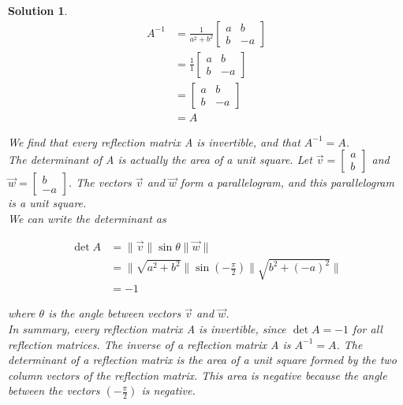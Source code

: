 \documentclass{article}
\newtheorem*{solution}{Solution}
\begin{document}
\begin{solution}
\begin{align*}
A^{-1} &= \displaystyle \frac{1}{a^2+b^2} \begin{bmatrix}a & b \\ b & -a \end{bmatrix} \\
&= \displaystyle \frac{1}{1} \begin{bmatrix}a & b \\ b & -a \end{bmatrix} \\
&= \begin{bmatrix}a & b \\ b & -a \end{bmatrix} \\
&= A
\end{align*}

We find that every reflection matrix A is invertible, and that $A^{-1} = A$. \\

The determinant of A is actually the area of a unit square. Let $\vec{v} = \begin{bmatrix} a \\ b \end{bmatrix}$ and $\vec{w} = \begin{bmatrix} b \\ -a \end{bmatrix}$. The vectors $\vec{v}$ and $\vec{w}$ form a parallelogram, and this parallelogram is a unit square. \\

We can write the determinant as

\begin{align*}
\det A &= \lVert \vec{v} \rVert \sin \theta \lVert \vec{w} \rVert \\
&= \lVert \sqrt{a^2+b^2} \rVert \sin \left(\displaystyle -\frac{\pi}{2}\right) \lVert \sqrt{b^2 + (-a)^2} \rVert \\
&= -1
\end{align*}

where $\theta$ is the angle between vectors $\vec{v}$ and $\vec{w}$. \\

In summary, every reflection matrix A is invertible, since $\det A = -1$ for all reflection matrices. The inverse of a reflection matrix A is $A^{-1} = A$. The determinant of a reflection matrix is the area of a unit square formed by the two column vectors of the reflection matrix. This area is negative because the angle between the vectors $\left(\displaystyle -\frac{\pi}{2}\right)$ is negative.

\end{solution}
\end{document}

